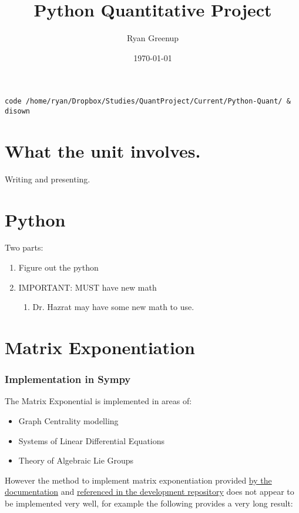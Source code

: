 \documentclass[11pt]{article}
\author{Ryan Greenup}
\date{\today}
\title{Python Quantitative Project}
\begin{document}
\maketitle
\tableofcontents




\begin{verbatim}
code /home/ryan/Dropbox/Studies/QuantProject/Current/Python-Quant/ & disown
\end{verbatim}

\section{What the unit involves.}
\label{sec:orgc40dc55}
Writing and presenting.
\section{Python}
\label{sec:orgc1442d0}
Two parts:
\begin{enumerate}
\item Figure out the python
\item IMPORTANT: MUST have new math
\begin{enumerate}
\item Dr. Hazrat may have some new math to use.
\end{enumerate}
\end{enumerate}

\section{Matrix Exponentiation}
\label{sec:org08b0575}
\subsubsection{Implementation in Sympy}
\label{sec:orgaaa51eb}
The Matrix Exponential is implemented in areas of:

\begin{itemize}
\item Graph Centrality modelling \cite{parkPowerWalkRevisiting2013}
\item Systems of Linear Differential Equations \cite[Ch. 8.4]{Zil2009}
\item Theory of Algebraic Lie Groups \cite[Ch. 2]{hallLieGroupsLie2015}
\end{itemize}

However the method to implement matrix exponentiation provided \href{https://docs.sympy.org/latest/tutorial/matrices.html}{by the documentation} \cite{MatricesSymPyDocumentation2020} and \href{https://github.com/sympy/sympy/issues/6218}{referenced in the development repository} \cite{MatrixExponentialIssue2019} does not appear to be implemented very well, for example the following provides a very long result:
\end{document}
